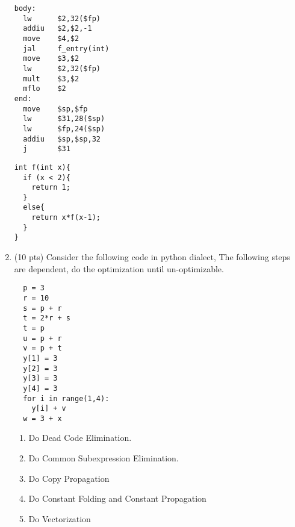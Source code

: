 \documentclass[10pt]{article}
\begin{document}
\begin{enumerate}
\begin{verbatim}
body:
  lw      $2,32($fp)
  addiu   $2,$2,-1
  move    $4,$2
  jal     f_entry(int)
  move    $3,$2
  lw      $2,32($fp)
  mult    $3,$2
  mflo    $2
end:
  move    $sp,$fp
  lw      $31,28($sp)
  lw      $fp,24($sp)
  addiu   $sp,$sp,32
  j       $31
\end{verbatim}
\begin{verbatim}
int f(int x){
  if (x < 2){
    return 1;
  }
  else{
    return x*f(x-1);
  }
}
\end{verbatim}


\item (10 pts) Consider the following code in python dialect, The following steps are dependent, do the optimization until un-optimizable.
\begin{verbatim}
  p = 3
  r = 10
  s = p + r
  t = 2*r + s
  t = p
  u = p + r
  v = p + t
  y[1] = 3
  y[2] = 3
  y[3] = 3
  y[4] = 3
  for i in range(1,4):
    y[i] + v
  w = 3 + x
\end{verbatim}
\begin{enumerate}
  \item Do Dead Code Elimination.
  \item Do Common Subexpression Elimination.
  \item Do Copy Propagation
  \item Do Constant Folding and Constant Propagation
  \item Do Vectorization
\end{enumerate}


\end{enumerate}
\end{document}
